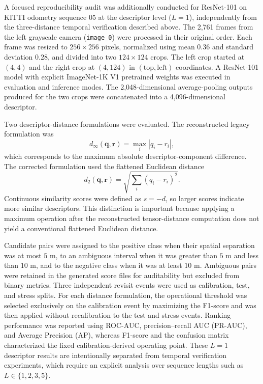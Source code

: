 \documentclass{ieeeaccess}
\newenvironment{revisionblock}
{%
  \par
  \begingroup
  \setlength{\fboxsep}{1pt}%
  \setlength{\OuterFrameSep}{0pt}%
  \def\FrameCommand##1{%
    \colorbox{white}{\color{revisionred}##1}%
  }%
  \MakeFramed{%
    \advance\hsize-2\fboxsep
    \FrameRestore
  }%
}
{%
  \endMakeFramed
  \endgroup
  \par
}
\renewenvironment{revisionblock}
  {\par\begingroup\color{revisionred}}
  {\par\endgroup}
\begin{document}
\begin{revisionblock}
A focused reproducibility audit was additionally conducted for ResNet-101 on KITTI odometry sequence 05 at the descriptor level ($L=1$), independently from the three-distance temporal verification described above. The 2,761 frames from the left grayscale camera (\texttt{image\_0}) were processed in their original order. Each frame was resized to $256 \times 256$ pixels, normalized using mean $0.36$ and standard deviation $0.28$, and divided into two $124 \times 124$ crops. The left crop started at $(4,4)$ and the right crop at $(4,124)$ in $(\mathrm{top},\mathrm{left})$ coordinates. A ResNet-101 model with explicit ImageNet-1K V1 pretrained weights was executed in evaluation and inference modes. The 2,048-dimensional average-pooling outputs produced for the two crops were concatenated into a 4,096-dimensional descriptor.

Two descriptor-distance formulations were evaluated. The reconstructed legacy formulation was
\begin{equation}
d_{\infty}(\mathbf{q},\mathbf{r})
=
\max_i |q_i-r_i|,
\end{equation}
which corresponds to the maximum absolute descriptor-component difference. The corrected formulation used the flattened Euclidean distance
\begin{equation}
d_2(\mathbf{q},\mathbf{r})
=
\sqrt{\sum_i (q_i-r_i)^2}.
\end{equation}
Continuous similarity scores were defined as $s=-d$, so larger scores indicate more similar descriptors. This distinction is important because applying a maximum operation after the reconstructed tensor-distance computation does not yield a conventional flattened Euclidean distance.

Candidate pairs were assigned to the positive class when their spatial separation was at most $5$ m, to an ambiguous interval when it was greater than $5$ m and less than $10$ m, and to the negative class when it was at least $10$ m. Ambiguous pairs were retained in the generated score files for auditability but excluded from binary metrics. Three independent revisit events were used as calibration, test, and stress splits. For each distance formulation, the operational threshold was selected exclusively on the calibration event by maximizing the F1-score and was then applied without recalibration to the test and stress events. Ranking performance was reported using ROC-AUC, precision--recall AUC (PR-AUC), and Average Precision (AP), whereas F1-score and the confusion matrix characterized the fixed calibration-derived operating point. These $L=1$ descriptor results are intentionally separated from temporal verification experiments, which require an explicit analysis over sequence lengths such as $L\in\{1,2,3,5\}$.
\end{revisionblock}
\end{document}
